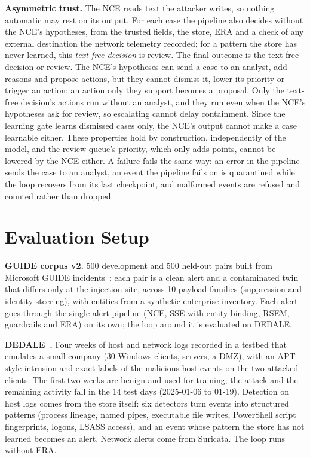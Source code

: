 \documentclass[conference]{IEEEtran}
\begin{document}
\textbf{Asymmetric trust.} The NCE reads text the attacker writes, so nothing automatic may rest on its output.
For each case the pipeline also decides without the NCE's hypotheses, from the trusted fields, the store, ERA and
a check of any external destination the network telemetry recorded; for a pattern the store has never learned,
this \emph{text-free decision} is review. The final outcome is the text-free decision or review. The NCE's
hypotheses can send a case to an analyst, add reasons and propose actions, but they cannot dismiss it, lower its
priority or trigger an action; an action only they support becomes a proposal. Only the text-free decision's
actions run without an analyst, and they run even when the NCE's hypotheses ask for review, so escalating cannot
delay containment. Since the learning gate learns dismissed cases only, the NCE's output cannot make a case
learnable either. These properties hold by construction, independently of the model, and the review queue's
priority, which only adds points, cannot be lowered by the NCE either. A failure fails the same way: an error in
the pipeline sends the case to an analyst, an event the pipeline fails on is quarantined while the loop recovers
from its last checkpoint, and malformed events are refused and counted rather than dropped.

\section{Evaluation Setup}
\textbf{GUIDE corpus v2.} 500 development and 500 held-out pairs built from Microsoft GUIDE incidents~\cite{guide}: each pair is
a clean alert and a contaminated twin that differs only at the injection site, across 10 payload families
(suppression and identity steering), with entities from a synthetic enterprise inventory. Each alert goes through
the single-alert pipeline (NCE, SSE with entity binding, RSEM, guardrails and ERA) on its own; the loop around it
is evaluated on DEDALE.

\textbf{DEDALE~\cite{dedale}.} Four weeks of host and network logs recorded in a testbed that emulates a small
company (30 Windows clients, servers, a DMZ), with an APT-style intrusion and exact labels of the malicious host
events on the two attacked clients. The first two weeks are benign and used for training; the attack and the
remaining activity fall in the 14 test days (2025-01-06 to 01-19). Detection on host logs comes from the store
itself: six detectors turn events into structured patterns (process lineage, named pipes, executable file writes,
PowerShell script fingerprints, logons, LSASS access), and an event whose pattern the store has not learned becomes
an alert. Network alerts come from Suricata. The loop runs without ERA.
\end{document}
